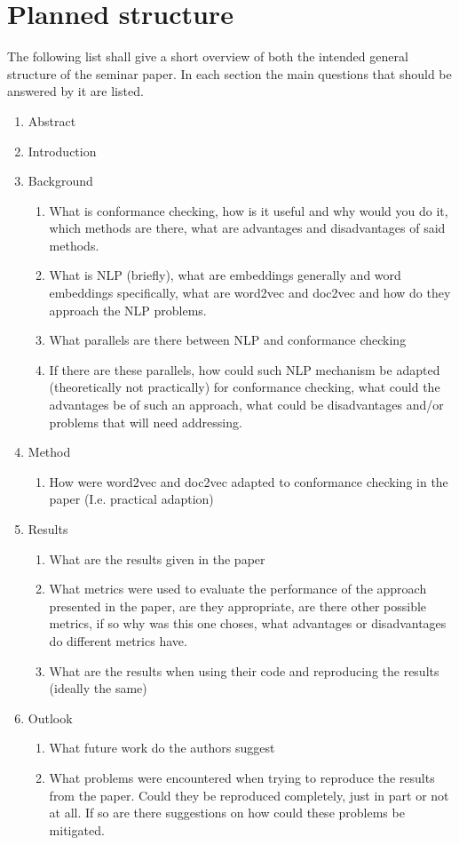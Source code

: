 \documentclass[runningheads]{llncs}
\begin{document}
\section{Planned structure}
The following list shall give a short overview of both the intended general structure of the seminar paper. In each section the main questions that should be answered by it are listed.
\begin{enumerate}
	\item Abstract
	\item Introduction
	\item Background
	\begin{enumerate}
		\item What is conformance checking, how is it useful and why would you do it, which methods are there, what are advantages and disadvantages of said methods.
		\item What is NLP (briefly), what are embeddings generally and word embeddings specifically, what are word2vec and doc2vec and how do they approach the NLP problems.
		\item What parallels are there between NLP and conformance checking
		\item If there are these parallels, how could such NLP mechanism be adapted (theoretically not practically) for conformance checking, what could the advantages be of such an approach, what could be disadvantages and/or problems that will need addressing.
	\end{enumerate}
	\item Method
	\begin{enumerate}
		\item How were word2vec and doc2vec adapted to conformance checking in the paper (I.e. practical adaption)
	\end{enumerate}
	\item Results
	\begin{enumerate}
		\item What are the results given in the paper
		\item What metrics were used to evaluate the performance of the approach presented in the paper, are they appropriate, are there other possible metrics, if so why was this one choses, what advantages or disadvantages do different metrics have.
		\item What are the results when using their code and reproducing the results (ideally the same)
	\end{enumerate}
	\item Outlook
	\begin{enumerate}
		\item What future work do the authors suggest
		\item What problems were encountered when trying to reproduce the results from the paper. Could they be reproduced completely, just in part or not at all. If so are there suggestions on how could these problems be mitigated.
	\end{enumerate}
\end{enumerate}
\end{document}
